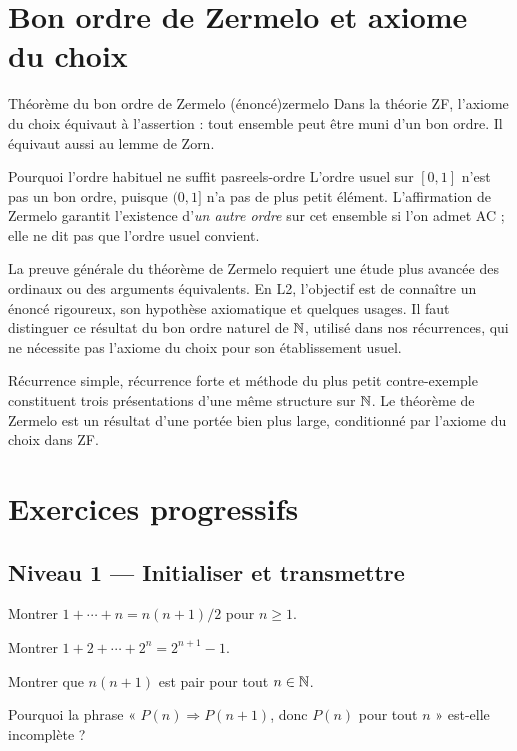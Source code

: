 \section{Bon ordre de Zermelo et axiome du choix}
\begin{theoreme}{Théorème du bon ordre de Zermelo (énoncé)}{zermelo}
Dans la théorie ZF, l'axiome du choix équivaut à l'assertion : tout ensemble peut être muni d'un bon ordre. Il équivaut aussi au lemme de Zorn.
\end{theoreme}
\begin{exemple}{Pourquoi l'ordre habituel ne suffit pas}{reels-ordre}
L'ordre usuel sur $[0,1]$ n'est pas un bon ordre, puisque $(0,1]$ n'a pas de plus petit élément. L'affirmation de Zermelo garantit l'existence d'\emph{un autre ordre} sur cet ensemble si l'on admet AC ; elle ne dit pas que l'ordre usuel convient.
\end{exemple}
La preuve générale du théorème de Zermelo requiert une étude plus avancée des ordinaux ou des arguments équivalents. En L2, l'objectif est de connaître un énoncé rigoureux, son hypothèse axiomatique et quelques usages. Il faut distinguer ce résultat du bon ordre naturel de $\mathbb N$, utilisé dans nos récurrences, qui ne nécessite pas l'axiome du choix pour son établissement usuel.
\begin{retenir}
Récurrence simple, récurrence forte et méthode du plus petit contre-exemple constituent trois présentations d'une même structure sur $\mathbb N$. Le théorème de Zermelo est un résultat d'une portée bien plus large, conditionné par l'axiome du choix dans ZF.
\end{retenir}

\section{Exercices progressifs}
\subsection*{Niveau 1 — Initialiser et transmettre}
\begin{exercice}\label{ex:rec:1}Montrer $1+\cdots+n=n(n+1)/2$ pour $n\ge1$.\end{exercice}
\begin{exercice}\label{ex:rec:2}Montrer $1+2+\cdots+2^n=2^{n+1}-1$.\end{exercice}
\begin{exercice}[Parité]\label{ex:rec:3}Montrer que $n(n+1)$ est pair pour tout $n\in\mathbb N$.\end{exercice}
\begin{exercice}\label{ex:rec:4}Pourquoi la phrase « $P(n)\Rightarrow P(n+1)$, donc $P(n)$ pour tout $n$ » est-elle incomplète ?\end{exercice}
